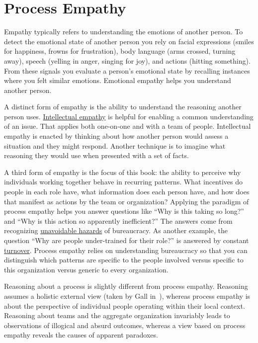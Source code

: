 \section{Process Empathy\label{sec:process-empathy}}

Empathy typically refers to understanding the emotions of another person. To detect the emotional state of another person you rely on facial expressions (smiles for happiness, frowns for frustration), body language (arms crossed, turning away), speech (yelling in anger, singing for joy), and actions (hitting something). From these signals you evaluate a person's emotional state by recalling instances where you felt similar emotions. Emotional empathy helps you understand another person. 

A distinct form of empathy is the ability to understand the reasoning another person uses.  
\hyperref[sec:intellectual-empathy]{Intellectual empathy} is helpful for enabling a common understanding of an issue. That applies both one-on-one and with a team of people. Intellectual empathy is enacted by thinking about how another person would assess a situation and they might respond. Another technique is to imagine what reasoning they would use when presented with a set of facts. 


A third form of empathy is the focus of this book: the ability to perceive why individuals working together behave in recurring patterns. What incentives do people in each role have, what information does each person have, and how does that manifest as actions by the team or organization? Applying the paradigm of \gls{process empathy} helps you answer questions like ``Why is this taking so long?'' and ``Why is this action so apparently inefficient?'' The answers come from recognizing \hyperref[sec:unavoidable-hazards]{unavoidable hazards} of bureaucracy. As another example, the question ``Why are people under-trained for their role?'' is answered by constant \hyperref[sec:turnover]{turnover}. Process empathy relies on understanding bureaucracy so that you can distinguish which patterns are specific to the people involved versus specific to this organization versus generic to every organization.

Reasoning about a process is slightly different from process empathy. Reasoning assumes a holistic external view (taken by Gall in~\cite{2002_Gall}), whereas process empathy is about the perspective of individual people operating within their local context. Reasoning about teams and the aggregate organization invariably leads to observations of illogical and absurd outcomes, whereas a view based on process empathy reveals the causes of apparent paradoxes.

